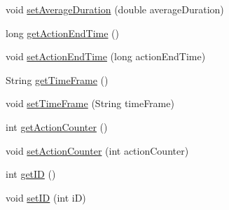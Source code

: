 \begin{DoxyCompactItemize}
\item 
void \hyperlink{classcs_1_1usense_1_1accelerometer_1_1_actions_entry_a91b38d1eb3ac7e601e49072228b9a5d3}{set\+Average\+Duration} (double average\+Duration)
\item 
long \hyperlink{classcs_1_1usense_1_1accelerometer_1_1_actions_entry_a6bcdf278bb6eebd84469f3ae3271c395}{get\+Action\+End\+Time} ()
\item 
void \hyperlink{classcs_1_1usense_1_1accelerometer_1_1_actions_entry_a53d11e1e56443f29591b38cb2588c96c}{set\+Action\+End\+Time} (long action\+End\+Time)
\item 
String \hyperlink{classcs_1_1usense_1_1accelerometer_1_1_actions_entry_aff01399559e13f2d6ff79f0b59d07ee5}{get\+Time\+Frame} ()
\item 
void \hyperlink{classcs_1_1usense_1_1accelerometer_1_1_actions_entry_a790c23f925c03b3a63f193305b19468d}{set\+Time\+Frame} (String time\+Frame)
\item 
int \hyperlink{classcs_1_1usense_1_1accelerometer_1_1_actions_entry_a3fbc7e4e63c8a8c80764d6b13b197852}{get\+Action\+Counter} ()
\item 
void \hyperlink{classcs_1_1usense_1_1accelerometer_1_1_actions_entry_aa22f94e499d1f58b128f4a58fa0db111}{set\+Action\+Counter} (int action\+Counter)
\item 
int \hyperlink{classcs_1_1usense_1_1accelerometer_1_1_actions_entry_aa6f9aa4a26819cdc45ea7b62596eff96}{get\+I\+D} ()
\item 
void \hyperlink{classcs_1_1usense_1_1accelerometer_1_1_actions_entry_a71fffb7ab4dc7e852024d0ca0ae22c14}{set\+I\+D} (int i\+D)
\end{DoxyCompactItemize}
